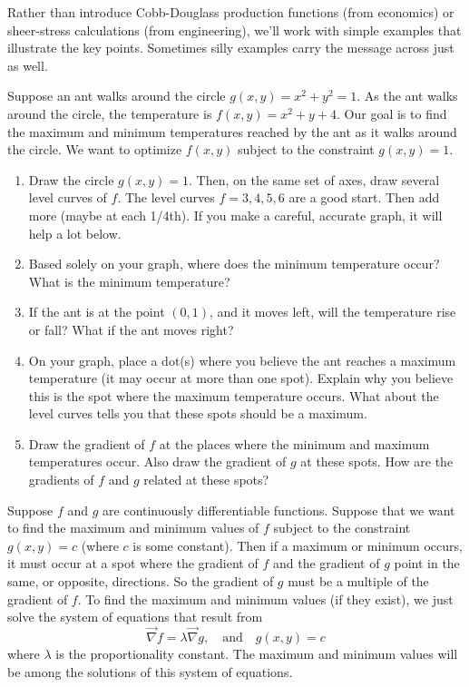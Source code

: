 Rather than introduce Cobb-Douglass production functions (from economics) or sheer-stress calculations (from engineering), we'll work with simple examples that illustrate the key points.  Sometimes silly examples carry the message across just as well.

\begin{problem}
 Suppose an ant walks around the circle $g(x,y)=x^2+y^2=1$.  As the ant walks around the circle, the temperature is $f(x,y) = x^2+y+4$.  Our goal is to find the maximum and minimum temperatures reached by the ant as it walks around the circle. We want to optimize $f(x,y)$ subject to the constraint $g(x,y)=1$. 
 \begin{enumerate}
  \item Draw the circle $g(x,y)=1$.  Then, on the same set of axes, draw several level curves of $f$. The level curves $f=3, 4, 5, 6$ are a good start. Then add more (maybe at each 1/4th). If you make a careful, accurate graph, it will help a lot below.
  \item Based solely on your graph, where does the minimum temperature occur?  What is the minimum temperature?
  \item If the ant is at the point $(0,1)$, and it moves left, will the temperature rise or fall?  What if the ant moves right? 
  \item On your graph, place a dot(s) where you believe the ant reaches a maximum temperature (it may occur at more than one spot). Explain why you believe this is the spot where the maximum temperature occurs. What about the level curves tells you that these spots should be a maximum.
  \item Draw the gradient of $f$ at the places where the minimum and maximum temperatures occur. Also draw the gradient of $g$ at these spots.  How are the gradients of $f$ and $g$ related at these spots?
 \end{enumerate}
\end{problem}

\begin{theorem}
Suppose $f$ and $g$ are continuously differentiable functions. Suppose that we want to find the maximum and minimum values of $f$ subject to the constraint $g(x,y)=c$ (where $c$ is some constant).  Then if a maximum or minimum occurs, it must occur at a spot where the gradient of $f$ and the gradient of $g$ point in the same, or opposite, directions. So the gradient of $g$ must be a multiple of the gradient of $f$. To find the maximum and minimum values (if they exist), we just solve the system of equations that result from  
$$\vec \nabla f = \lambda \vec \nabla g,\quad \text{and}\quad g(x,y)=c$$ where $\lambda$ is the proportionality constant. The maximum and minimum values will be among the solutions of this system of equations. 
\end{theorem}

